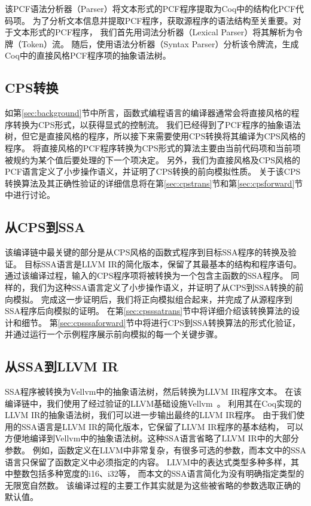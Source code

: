 该PCF语法分析器（Parser）将文本形式的PCF程序提取为Coq中的结构化PCF代码项。
为了分析文本信息并提取PCF程序，获取源程序的语法结构至关重要。对于文本形式的PCF程序，
我们首先用词法分析器（Lexical Parser）将其解析为令牌（Token）流。
随后，使用语法分析器（Syntax Parser）分析该令牌流，生成Coq中的直接风格PCF程序项的抽象语法树。

\subsection{CPS转换}

如第\ref{sec:background}节中所言，函数式编程语言的编译器通常会将直接风格的程序转换为CPS形式，以获得显式的控制流。
我们已经得到了PCF程序的抽象语法树，但它是直接风格的程序，所以接下来需要使用CPS转换将其编译为CPS风格的程序。
将直接风格的PCF程序转换为CPS形式的算法主要由当前代码项和当前项被规约为某个值后要处理的下一个项决定。
另外，我们为直接风格及CPS风格的PCF语言定义了小步操作语义，并证明了CPS转换的前向模拟性质。
关于该CPS转换算法及其正确性验证的详细信息将在第\ref{sec:cpstrans}节和第\ref{sec:cpsforward}节中进行讨论。

\subsection{从CPS到SSA}

该编译链中最关键的部分是从CPS风格的函数式程序到目标SSA程序的转换及验证。
目标SSA语言是LLVM IR的简化版本，保留了其最基本的结构和程序语句。
通过该编译过程，输入的CPS程序项将被转换为一个包含主函数的SSA程序。
同样的，我们为这种SSA语言定义了小步操作语义，并证明了从CPS到SSA转换的前向模拟。
完成这一步证明后，我们将正向模拟组合起来，并完成了从源程序到SSA程序后向模拟的证明。
在第\ref{sec:cpsssatrans}节中将详细介绍该转换算法的设计和细节。
第\ref{sec:cpsssaforward}节中将进行CPS到SSA转换算法的形式化验证，并通过运行一个示例程序展示前向模拟的每一个关键步骤。

\subsection{从SSA到LLVM IR}

SSA程序被转换为Vellvm中的抽象语法树，然后转换为LLVM IR程序文本。
在该编译链中，我们使用了经过验证的LLVM基础设施Vellvm~\cite{zakowski2021modular}。
利用其在Coq实现的LLVM IR的抽象语法树，我们可以进一步输出最终的LLVM IR程序。
由于我们使用的SSA语言是LLVM IR的简化版本，它保留了LLVM IR程序的基本结构，
可以方便地编译到Vellvm中的抽象语法树。这种SSA语言省略了LLVM IR中的大部分参数。
例如，函数定义在LLVM中非常复杂，有很多可选的参数，而本文中的SSA语言只保留了函数定义中必须指定的内容。
LLVM中的表达式类型多种多样，其中整数包括多种宽度的i16、i32等，
而本文的SSA语言简化为没有明确指定类型的无限宽自然数。
该编译过程的主要工作其实就是为这些被省略的参数选取正确的默认值。
